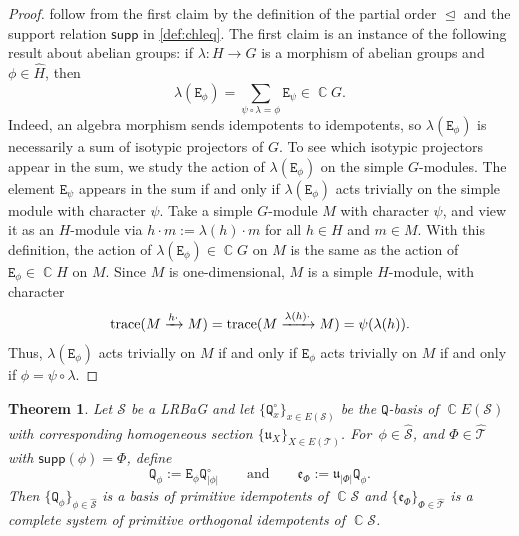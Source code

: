 \documentclass[11pt, oneside, reqno]{amsart}
\newtheorem{theorem}{Theorem}[section]
\theoremstyle{definition}
\numberwithin{equation}{section}
\DeclareMathOperator{\C}{\mathbb{C}}
\def \SS{{\mathcal{S}}}
\def \TT{{\mathcal{T}}}
\def \kk{\C}
\def \uu{{\mathfrak{u}}}
\def \ee{{\mathfrak{e}}}
\def \wh{\widehat}
\DeclareMathOperator{\chleq}{\unlhd}
\def\qqand{\qquad\text{and}\qquad}
\def \supp{\mathsf{supp}}
\newcommand{\B}[1]{\mathtt{#1}} 			%
\newcommand{\abs}[1]{|{#1}|} 				%
\begin{document}
\begin{proof}
     follow from the first claim by the definition of the partial order $\chleq$ and the support relation $\supp$ in \cref{def:chleq}.
    The first claim is an instance of the following result about abelian groups:
    if $\lambda : H \to G$ is a morphism of abelian groups and $\phi \in \wh{H}$, then
    \[
        \lambda(\B{E}_\phi) = \sum_{\psi \circ \lambda = \phi} \B{E}_\psi \in \kk G.
    \]
    Indeed, an algebra morphism sends idempotents to idempotents, so $\lambda(\B{E}_\phi)$ is necessarily a sum of isotypic projectors of $G$.
    To see which isotypic projectors appear in the sum, we study the action of $\lambda(\B{E}_\phi)$ on the simple $G$-modules. The element $\B{E}_\psi$ appears in the sum if and only if $\lambda(\B{E}_\phi)$ acts trivially on the simple module with character $\psi$.
    Take a simple $G$-module $M$ with character $\psi$, and view it as an $H$-module via $h \cdot m := \lambda(h) \cdot m$ for all $h \in H$ and $m \in M$.
    With this definition, the action of $\lambda(\B{E}_\phi)  \in \kk G$ on $M$ is the same as the action of $\B{E}_\phi \in \kk H$ on $M$.
    Since $M$ is one-dimensional, $M$ is a simple $H$-module, with character
    \[
        {\rm trace}(M \xrightarrow{{h} \cdot } M)
        = {\rm trace}(M \xrightarrow{{\lambda(h)} \cdot } M)
        = \psi(\lambda(h)).
    \]
    Thus, $\lambda(\B{E}_\phi)$ acts trivially on $M$ if and only if $\B{E}_\phi$ acts trivially on $M$ if and only if $\phi = \psi \circ \lambda$.
\end{proof}


\begin{theorem}\label{t:CSoPOI-LRBaG}
    Let $\SS$ be a LRBaG and let
    $\{ \B{Q}^\circ_x \}_{x \in E(\SS)}$ be the $\B{Q}$-basis of $\kk E(\SS)$
    with corresponding homogeneous section $\{ \uu_X \}_{X \in E(\TT)}$.
    For~$\phi \in \wh{\SS}$, and $\Phi \in \wh{\TT}$ with $\supp(\phi) = \Phi$, define
    \begin{equation}\label{eq:CSoPOI-LRBaG}
        \B{Q}_\phi := \B{E}_\phi \B{Q}^\circ_{\abs{\phi}}
        \qqand
        \ee_\Phi := \uu_{\abs{\Phi}} \B{Q}_\phi.
    \end{equation}
    Then $\{\B{Q}_{\phi}\}_{\phi \in \wh{\SS}}$ is a basis of primitive idempotents of $\kk \SS$
    and $\{ \ee_\Phi \}_{\Phi \in \wh{\TT}}$ is a complete system of primitive orthogonal
    idempotents of $\kk \SS$.
\end{theorem}
\end{document}
